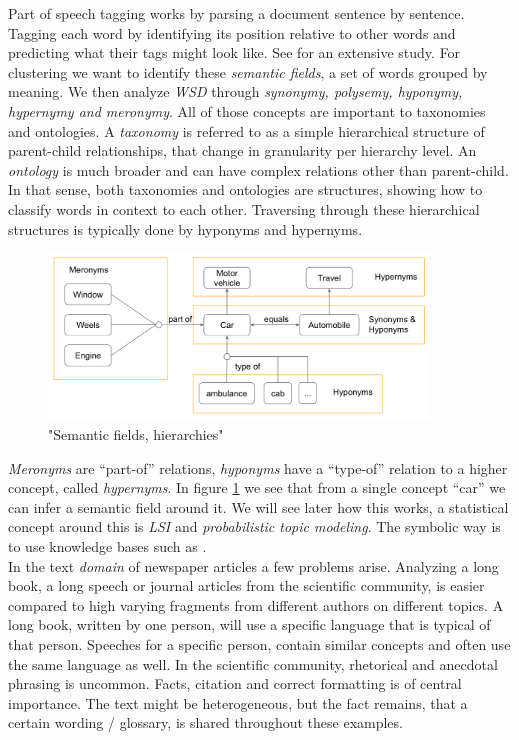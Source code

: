  Part of speech tagging works by parsing a document sentence by sentence. Tagging each word by identifying its position relative to other words and predicting what their tags might look like. See \cite[chp. 5]{NLPBookJurafsky2000} for an extensive study.
  For clustering we want to identify these \emph{semantic fields}, a set of words grouped by meaning. We then analyze \emph{WSD} through \emph{synonymy, polysemy, hyponymy, hypernymy and meronymy}. All of those concepts are important to taxonomies and ontologies. A \emph{taxonomy} is referred to as a simple hierarchical structure of parent-child relationships, that change in granularity per hierarchy level. An \emph{ontology} is much broader and can have complex relations other than parent-child. In that sense, both taxonomies and ontologies are structures, showing how to classify words in context to each other. Traversing through these hierarchical structures is typically done by hyponyms and hypernyms. 

    \begin{figure}[h!]
      \centering
        \includegraphics[width=0.9\textwidth]{wsd_analysis.png}
        \caption{"Semantic fields, hierarchies"}
        \label{wsd_analysis}
    \end{figure} 

  \emph{Meronyms} are ``part-of'' relations, \emph{hyponyms} have a ``type-of'' relation to a higher concept, called \emph{hypernyms}. In figure \ref{wsd_analysis} we see that from a single concept ``car'' we can infer a semantic field around it. We will see later how this works, a statistical concept around this is \emph{LSI} and \emph{probabilistic topic modeling}. The symbolic way is to use knowledge bases such as \wordwiki{}.\\

  In the text \emph{domain} of newspaper articles a few problems arise. Analyzing a long book, a long speech or journal articles from the scientific community, is easier compared to high varying fragments from different authors on different topics. A long book, written by one person, will use a specific language that is typical of that person. Speeches for a specific person, contain similar concepts and often use the same language as well. In the scientific community, rhetorical and anecdotal phrasing is uncommon. Facts, citation and correct formatting is of central importance. The text might be heterogeneous, but the fact remains, that a certain wording / glossary, is shared throughout these examples.\\

